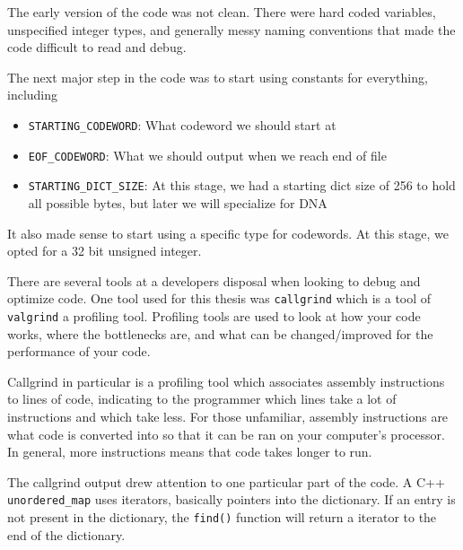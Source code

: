 \documentclass[12pt,twoside]{reedthesis}
\providecommand{\tightlist}{%
  \setlength{\itemsep}{0pt}\setlength{\parskip}{0pt}}
\begin{document}
The early version of the code was not clean. There were hard coded variables, unspecified integer types, and generally messy naming conventions that made the code difficult to read and debug.

The next major step in the code was to start using constants for everything, including
\begin{itemize}
\tightlist
\item
  \texttt{STARTING\_CODEWORD}: What codeword we should start at
\item
  \texttt{EOF\_CODEWORD}: What we should output when we reach end of file
\item
  \texttt{STARTING\_DICT\_SIZE}: At this stage, we had a starting dict size of 256 to hold all possible bytes, but later we will specialize for DNA
\end{itemize}
It also made sense to start using a specific type for codewords. At this stage, we opted for a 32 bit unsigned integer.

There are several tools at a developers disposal when looking to debug and optimize code. One tool used for this thesis was \texttt{callgrind} which is a tool of \texttt{valgrind} a profiling tool. Profiling tools are used to look at how your code works, where the bottlenecks are, and what can be changed/improved for the performance of your code.

Callgrind in particular is a profiling tool which associates assembly instructions to lines of code, indicating to the programmer which lines take a lot of instructions and which take less. For those unfamiliar, assembly instructions are what code is converted into so that it can be ran on your computer's processor. In general, more instructions means that code takes longer to run.

The callgrind output drew attention to one particular part of the code. A C++ \texttt{unordered\_map} uses iterators, basically pointers into the dictionary. If an entry is not present in the dictionary, the \texttt{find()} function will return a iterator to the end of the dictionary.
\end{document}
